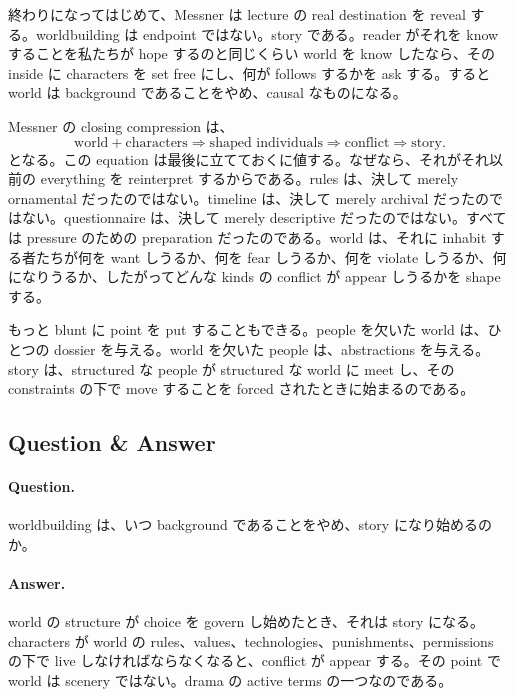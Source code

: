 終わりになってはじめて、Messner は lecture の real destination を reveal する。worldbuilding は endpoint ではない。story である。reader がそれを know することを私たちが hope するのと同じくらい world を know したなら、その inside に characters を set free にし、何が follows するかを ask する。すると world は background であることをやめ、causal なものになる。

Messner の closing compression は、
\begin{equation}
\text{world} + \text{characters} \Rightarrow \text{shaped individuals} \Rightarrow \text{conflict} \Rightarrow \text{story}.
\end{equation}
となる。この equation は最後に立てておくに値する。なぜなら、それがそれ以前の everything を reinterpret するからである。rules は、決して merely ornamental だったのではない。timeline は、決して merely archival だったのではない。questionnaire は、決して merely descriptive だったのではない。すべては pressure のための preparation だったのである。world は、それに inhabit する者たちが何を want しうるか、何を fear しうるか、何を violate しうるか、何になりうるか、したがってどんな kinds の conflict が appear しうるかを shape する。

もっと blunt に point を put することもできる。people を欠いた world は、ひとつの dossier を与える。world を欠いた people は、abstractions を与える。story は、structured な people が structured な world に meet し、その constraints の下で move することを forced されたときに始まるのである。

\subsection{Question \& Answer}

\paragraph{Question.} worldbuilding は、いつ background であることをやめ、story になり始めるのか。

\paragraph{Answer.} world の structure が choice を govern し始めたとき、それは story になる。characters が world の rules、values、technologies、punishments、permissions の下で live しなければならなくなると、conflict が appear する。その point で world は scenery ではない。drama の active terms の一つなのである。

